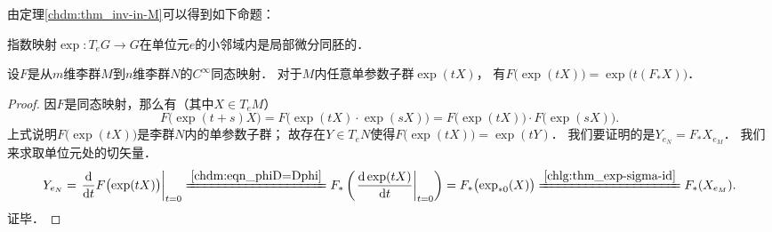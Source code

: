 由定理\ref{chdm:thm_inv-in-M}可以得到如下命题：
\begin{proposition}\label{chlg:thm_exp-sigma-id-cor1}
    指数映射$\exp : T_e G \to G$在单位元$e$的小邻域内是局部微分同胚的．
\end{proposition}



\begin{theorem}\label{chlg:thm_feef}
    设$F$是从$m$维李群$M$到$n$维李群$N$的$C^\infty$同态映射．
    对于$M$内任意单参数子群$\exp (tX)$，
    有$F\bigl(\exp (tX)\bigr) = \exp \bigl(t (F_{*} X)\bigr)$．
\end{theorem}
\begin{proof}
    因$F$是同态映射，那么有（其中$X\in T_eM$）
    \begin{equation*}
        F\bigl(\exp (t+s)X\bigr)=F\bigl(\exp (tX) \cdot \exp (sX) \bigr)
        =F\bigl(\exp (tX) \bigr)\cdot F\bigl( \exp (sX) \bigr) .
    \end{equation*}
    上式说明$F\bigl(\exp (tX)\bigr)$是李群$N$内的单参数子群；
    故存在$Y\in T_eN$使得$F\bigl(\exp (tX)\bigr)= \exp(tY)$．
    我们要证明的是$Y_{e_N} = F_* X_{e_M}$．
    我们来求取单位元处的切矢量．
    \begin{equation*}
        Y_{e_N}=
        \left.\frac{{\rm d}}{{\rm d} t}F\bigl(\exp (tX)\bigr)\right|_{t=0}
        \xlongequal{\ref{chdm:eqn_phiD=Dphi}}
        F_{*} \left(\left.\frac{{\rm d}\exp (tX)}{{\rm d} t}\right|_{t=0} \right)
        =F_{*} \bigl(\exp_{*0}(X) \bigr)   
        \xlongequal{\ref{chlg:thm_exp-sigma-id}}F_{*} (X_{e_M}) .
    \end{equation*} %
    证毕．
\end{proof}


